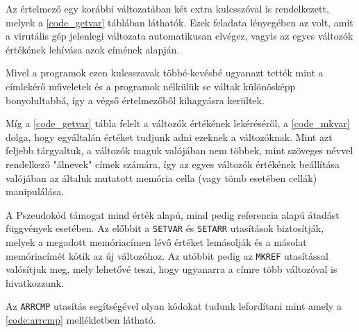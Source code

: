 Az értelmező egy korábbi változatában két extra kulcsszóval is rendelkezett, melyek a \ref{code_getvar} táblában láthatók. Ezek feladata lényegében az volt, amit a virutális gép jelenlegi változata automatikusan elvégez, vagyis az egyes változók értékének lehívása azok címének alapján.

Mivel a programok ezen kulcsszavak többé-kevésbé ugyanazt tették mint a címlekérő műveletek és a programok nélkülük se váltak különösképp bonyolultabbá, így a végső értelmezőből kihagyásra kerültek.


Míg a \ref{code_getvar} tábla felelt a változók értékének lekéréséről, a \ref{code_mkvar} dolga, hogy egyáltalán értéket tudjunk adni ezeknek a változóknak. Mint azt feljebb tárgyaltuk, a változók maguk valójában nem többek, mint szöveges névvel rendelkező "álnevek" címek számára, így az egyes változók értékének beállítása valójában az általuk mutatott memória cella (vagy tömb esetében cellák) manipulálása.

A Pszeudokód támogat mind érték alapú, mind pedig referencia alapú átadást függvények esetében. Az előbbit a \texttt{SETVAR} és \texttt{SETARR} utasítások biztosítják, melyek a megadott memóriacímen lévő értéket lemásolják és a másolat memóriacímét kötik az új változóhoz. Az utóbbit pedig az \texttt{MKREF} utasítással valósítjuk meg, mely lehetővé teszi, hogy ugyanarra a címre több változóval is hivatkozzunk.

Az \texttt{ARRCMP} utasítás segítségével olyan kódokat tudunk lefordítani mint amely a \ref{code:arrcmp} mellékletben látható.

